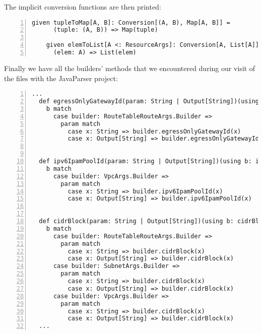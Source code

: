 The implicit conversion functions are then printed:\\
\begin{minipage}{\linewidth}
  \begin{lstlisting}[numbers=left, numberstyle=\tiny, numbersep=-5pt, stepnumber=1]
    given tupleToMap[A, B]: Conversion[(A, B), Map[A, B]] =
      (tuple: (A, B)) => Map(tuple)
  
    given elemToList[A <: ResourceArgs]: Conversion[A, List[A]] =
      (elem: A) => List(elem)
  \end{lstlisting}
 \end{minipage}
Finally we have all the builders' methods that we encountered during our visit of the files with the JavaParser project:\\
\begin{minipage}{\linewidth}
  \begin{lstlisting}[numbers=left, numberstyle=\tiny, numbersep=-5pt, stepnumber=1]
  ...
  def egressOnlyGatewayId(param: String | Output[String])(using b: egressOnlyGatewayIdOwners): Unit =
    b match
      case builder: RouteTableRouteArgs.Builder =>
        param match
          case x: String => builder.egressOnlyGatewayId(x)
          case x: Output[String] => builder.egressOnlyGatewayId(x)
  
  
  def ipv6IpamPoolId(param: String | Output[String])(using b: ipv6IpamPoolIdOwners): Unit =
    b match
      case builder: VpcArgs.Builder =>
        param match
          case x: String => builder.ipv6IpamPoolId(x)
          case x: Output[String] => builder.ipv6IpamPoolId(x)
  
  
  def cidrBlock(param: String | Output[String])(using b: cidrBlockOwners): Unit =
    b match
      case builder: RouteTableRouteArgs.Builder =>
        param match
          case x: String => builder.cidrBlock(x)
          case x: Output[String] => builder.cidrBlock(x)
      case builder: SubnetArgs.Builder =>
        param match
          case x: String => builder.cidrBlock(x)
          case x: Output[String] => builder.cidrBlock(x)
      case builder: VpcArgs.Builder =>
        param match
          case x: String => builder.cidrBlock(x)
          case x: Output[String] => builder.cidrBlock(x)
  ...
  \end{lstlisting}
\end{minipage}
